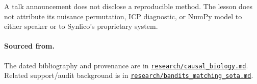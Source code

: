 \documentclass[11pt,oneside]{scrbook}
\begin{document}
\begin{pitfall}
A talk announcement does not disclose a reproducible method. The lesson does not
attribute its nuisance permutation, ICP diagnostic, or NumPy model to either speaker
or to Synlico's proprietary system.
\end{pitfall}
\paragraph{Sourced from.} The dated bibliography and provenance are in
\href{../research/causal_biology.md}{\texttt{research/causal\_biology.md}}.
Related support/audit background is in
\href{../research/bandits_matching_sota.md}{\texttt{research/bandits\_matching\_sota.md}}.
\end{document}
